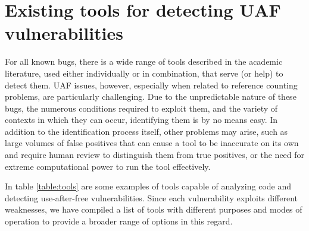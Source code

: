 \section{Existing tools for detecting UAF vulnerabilities}
For all known bugs, there is a wide range of tools described in the academic literature, used either individually or in combination, that serve (or help) to detect them. UAF issues, however, especially when related to reference counting problems, are particularly challenging.
Due to the unpredictable nature of these bugs, the numerous conditions required to exploit them, and the variety of contexts in which they can occur, identifying them is by no means easy. In addition to the identification process itself, other problems may arise, such as large volumes of false positives that can cause a tool to be inaccurate on its own and require human review to distinguish them from true positives, or the need for extreme computational power to run the tool effectively.

In table \ref{table:tools} are some examples of tools capable of analyzing code and detecting use-after-free vulnerabilities. Since each vulnerability exploits different weaknesses, we have compiled a list of tools with different purposes and modes of operation to provide a broader range of options in this regard.

